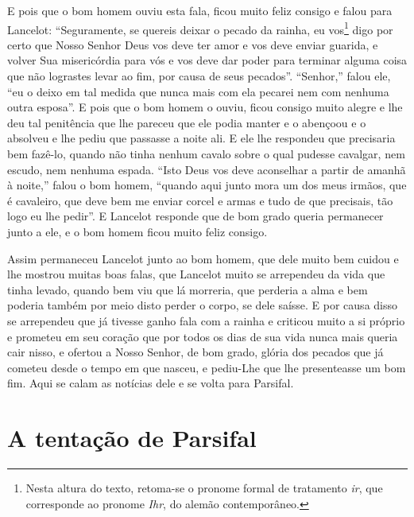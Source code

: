 E pois que o bom homem ouviu esta fala, ficou muito feliz consigo e falou para
Lancelot: “Seguramente, se quereis deixar o pecado da rainha, eu vos\footnote{
Nesta altura do texto, retoma-se o pronome formal de tratamento \textit{ir},
que corresponde ao pronome \textit{Ihr}, do alemão contemporâneo.
 } digo por certo que Nosso Senhor Deus vos deve ter amor e vos deve enviar
guarida, e volver Sua misericórdia para vós e vos deve dar poder para terminar
alguma coisa que não lograstes levar ao fim, por causa de seus pecados”. 
“Senhor,” falou ele, “eu o deixo em tal medida que nunca mais com ela
pecarei nem com nenhuma outra esposa”. E pois que o bom homem o ouviu, ficou
consigo muito alegre e lhe deu tal penitência que lhe pareceu que ele podia
manter e o abençoou e o absolveu e lhe pediu que passasse a noite ali. E ele
lhe respondeu que precisaria bem fazê-lo, quando não tinha nenhum cavalo sobre
o qual pudesse cavalgar, nem escudo, nem nenhuma espada. “Isto Deus vos deve
aconselhar a partir de amanhã à noite,” falou o bom homem, “quando aqui junto
mora um dos meus irmãos, que é cavaleiro, que deve bem me enviar corcel e armas
e tudo de que precisais, tão logo eu lhe pedir”. E Lancelot responde
que de bom grado queria permanecer junto a ele, e o bom homem ficou muito feliz
consigo.

Assim permaneceu Lancelot junto ao bom homem, que dele muito bem cuidou e lhe
mostrou muitas boas falas, que Lancelot muito se arrependeu da vida que tinha
levado, quando bem viu que lá morreria, que perderia a alma e bem poderia
também por meio disto perder o corpo, se dele saísse. E por causa disso se
arrependeu que já tivesse ganho fala com a rainha e criticou muito a si próprio
e prometeu em seu coração que por todos os dias de sua vida nunca mais queria
cair nisso, e ofertou a Nosso Senhor, de bom grado, glória dos pecados que já
cometeu desde o tempo em que nasceu, e pediu-Lhe que lhe presenteasse um bom
fim. Aqui se calam as notícias dele e se volta para Parsifal. 

\chapter{A tentação de Parsifal}

